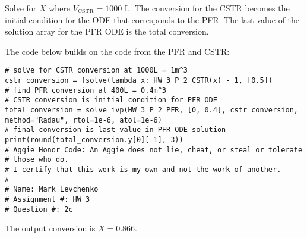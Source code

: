 \documentclass[12pt]{article}
\begin{document}
\begin{enumerate}
\begin{enumerate}
        Solve for $X$ where $V_{\mathrm{CSTR}}=1000$ L. The conversion for the CSTR becomes the initial condition for the ODE that corresponds to the PFR. The last value of the solution array for the PFR ODE is the total conversion.

        The code below builds on the code from the PFR and CSTR:

\begin{verbatim}
# solve for CSTR conversion at 1000L = 1m^3
cstr_conversion = fsolve(lambda x: HW_3_P_2_CSTR(x) - 1, [0.5])
# find PFR conversion at 400L = 0.4m^3
# CSTR conversion is initial condition for PFR ODE
total_conversion = solve_ivp(HW_3_P_2_PFR, [0, 0.4], cstr_conversion, method="Radau", rtol=1e-6, atol=1e-6)
# final conversion is last value in PFR ODE solution
print(round(total_conversion.y[0][-1], 3))
# Aggie Honor Code: An Aggie does not lie, cheat, or steal or tolerate
# those who do.
# I certify that this work is my own and not the work of another.
#
# Name: Mark Levchenko
# Assignment #: HW 3
# Question #: 2c
\end{verbatim}

        The output conversion is $\boxed{X=0.866}$.
        
    \end{enumerate} 



\end{enumerate}
\end{document}
